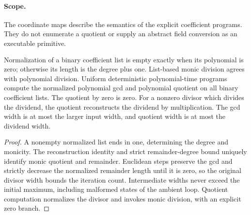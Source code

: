 \paragraph{Scope.} The coordinate maps describe the semantics of the explicit
coefficient programs. They do not enumerate a quotient or supply an abstract
field conversion as an executable primitive.

\begin{lemma}
\label{lem:binary-euclidean-algorithms}
\leanok
Normalization of a binary coefficient list is empty exactly when its polynomial
is zero; otherwise its length is the degree plus one. List-based monic division
agrees with polynomial division. Uniform deterministic polynomial-time programs
compute the normalized polynomial gcd and polynomial quotient on all binary
coefficient lists. The quotient by zero is zero. For a nonzero divisor which
divides the dividend, the quotient reconstructs the dividend by multiplication.
The gcd width is at most the larger input width, and quotient width is at most
the dividend width.
\end{lemma}
\begin{proof}
\leanok
A nonempty normalized list ends in one, determining the degree and monicity.
The reconstruction identity and strict remainder-degree bound uniquely identify
monic quotient and remainder. Euclidean steps preserve the gcd and strictly
decrease the normalized remainder length until it is zero, so the original
divisor width bounds the iteration count. Intermediate widths never exceed the
initial maximum, including malformed states of the ambient loop. Quotient
computation normalizes the divisor and invokes monic division, with an explicit
zero branch.
\end{proof}

